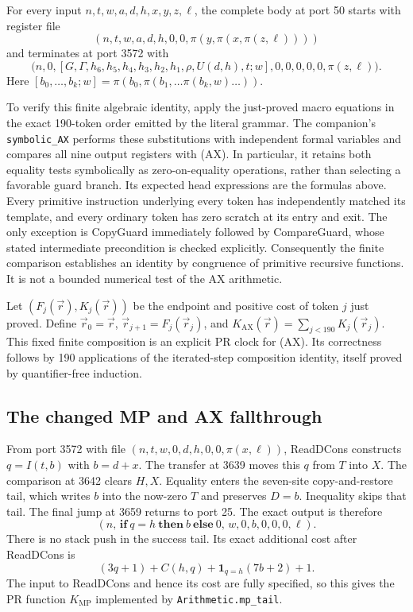 For every input $n,t,w,a,d,h,x,y,z,\ell$, the complete body at
port 50 starts with register file
\[
 (n,t,w,a,d,h,0,0,\pi(y,\pi(x,\pi(z,\ell))))
\]
and terminates at port 3572 with
\[
 \bigl(n,0,[G,\Gamma,h_6,h_5,h_4,h_3,h_2,h_1,
          \rho,U(d,h),t;w],0,0,0,0,0,\pi(z,\ell)\bigr).       \tag{AX}
\]
Here $[b_0,\ldots,b_k;w]=\pi(b_0,\pi(b_1,\ldots\pi(b_k,w)\ldots))$.

To verify this finite algebraic identity, apply the just-proved macro
equations in the exact 190-token order emitted by the literal grammar.
The companion's \texttt{symbolic\_AX} performs these substitutions with
independent formal variables and compares all nine output registers with
(AX).  In particular, it retains both equality tests symbolically as
zero-on-equality operations, rather than selecting a favorable guard
branch.  Its expected head expressions are the formulas above.
Every primitive instruction underlying every token has independently
matched its template, and every ordinary token has zero scratch at its
entry and exit.  The only exception is CopyGuard immediately followed by
CompareGuard, whose stated intermediate precondition is checked explicitly.
Consequently the finite comparison establishes an identity by congruence
of primitive recursive functions.  It is not a bounded numerical test of
the AX arithmetic.

Let $(F_j(\vec r),K_j(\vec r))$ be the endpoint and positive cost of
token $j$ just proved.  Define $\vec r_0=\vec r$,
$\vec r_{j+1}=F_j(\vec r_j)$, and
$K_{\mathrm{AX}}(\vec r)=\sum_{j<190}K_j(\vec r_j)$.
This fixed finite composition is an explicit PR clock for (AX).
Its correctness follows by 190 applications of the iterated-step
composition identity, itself proved by quantifier-free induction.

\subsection{The changed MP and AX fallthrough}

From port 3572 with file $(n,t,w,0,d,h,0,0,\pi(x,\ell))$,
ReadDCons constructs $q=I(t,b)$ with $b=d+x$.
The transfer at 3639 moves this $q$ from $T$ into $X$.
The comparison at 3642 clears $H,X$.  Equality enters the seven-site
copy-and-restore tail, which writes $b$ into the now-zero $T$ and preserves
$D=b$.  Inequality skips that tail.  The final jump at 3659 returns to
port 25.  The exact output is therefore
\[
 (n,\,\mathbf{if}\ q=h\ \mathbf{then}\ b\ \mathbf{else}\ 0,
     \,w,0,b,0,0,0,\ell).                                  \tag{MP}
\]
There is no stack push in the success tail.  Its exact additional cost
after ReadDCons is
\[
 (3q+1)+C(h,q)+\mathbf 1_{q=h}(7b+2)+1.
\]
The input to ReadDCons and hence its cost are fully specified, so this
gives the PR function $K_{\mathrm{MP}}$ implemented by
\texttt{Arithmetic.mp\_tail}.

